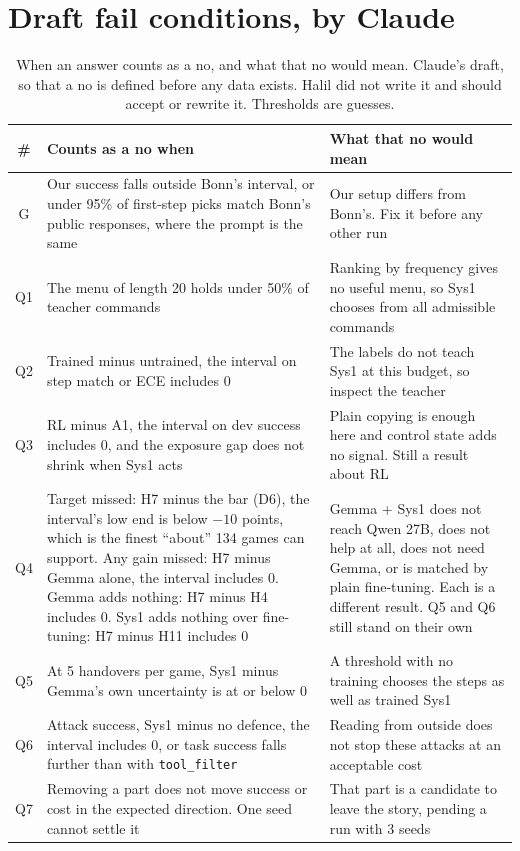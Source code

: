 \documentclass[10pt]{article}
\begin{document}
\section{Draft fail conditions, by Claude}

\begin{table}[H]
\footnotesize
\caption{When an answer counts as a no, and what that no would mean. Claude's draft, so that a no is defined before any data exists. Halil did not write it and should accept or rewrite it. Thresholds are guesses.}
\begin{tabularx}{\linewidth}{@{}c L L@{}}
\toprule
\# & Counts as a no when & What that no would mean \\
\midrule
G & Our success falls outside Bonn's interval, or under 95\% of first-step picks match Bonn's public responses, where the prompt is the same & Our setup differs from Bonn's. Fix it before any other run \\
Q1 & The menu of length 20 holds under 50\% of teacher commands & Ranking by frequency gives no useful menu, so Sys1 chooses from all admissible commands \\
Q2 & Trained minus untrained, the interval on step match or ECE includes 0 & The labels do not teach Sys1 at this budget, so inspect the teacher \\
Q3 & RL minus A1, the interval on dev success includes 0, and the exposure gap does not shrink when Sys1 acts & Plain copying is enough here and control state adds no signal. Still a result about RL \\
Q4 & Target missed: H7 minus the bar (D6), the interval's low end is below $-10$ points, which is the finest ``about'' 134 games can support. Any gain missed: H7 minus Gemma alone, the interval includes 0. Gemma adds nothing: H7 minus H4 includes 0. Sys1 adds nothing over fine-tuning: H7 minus H11 includes 0 & Gemma + Sys1 does not reach Qwen 27B, does not help at all, does not need Gemma, or is matched by plain fine-tuning. Each is a different result. Q5 and Q6 still stand on their own \\
Q5 & At 5 handovers per game, Sys1 minus Gemma's own uncertainty is at or below 0 & A threshold with no training chooses the steps as well as trained Sys1 \\
Q6 & Attack success, Sys1 minus no defence, the interval includes 0, or task success falls further than with \texttt{tool\_filter} & Reading from outside does not stop these attacks at an acceptable cost \\
Q7 & Removing a part does not move success or cost in the expected direction. One seed cannot settle it & That part is a candidate to leave the story, pending a run with 3 seeds \\
\bottomrule
\end{tabularx}
\end{table}
\end{document}

